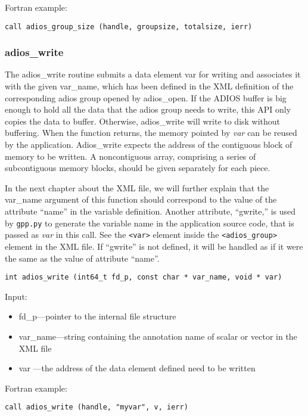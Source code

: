 Fortran example: 
\begin{lstlisting}[alsolanguage=Fortran, caption={}]
call adios_group_size (handle, groupsize, totalsize, ierr)
\end{lstlisting}

\subsubsection{adios\_write}
The adios\_write routine submits a data element var for writing and associates 
it with the given var\_name, which has been defined in the XML definition of the 
corresponding adios group opened by 
adios\_open. If the ADIOS buffer is big enough to hold all the data that the adios 
group needs to write, this API only copies the data to buffer. Otherwise, adios\_write 
will write to disk without buffering. When the function returns, the memory pointed
by \textit{var} can be reused by the application. 
Adios\_write expects the address of the contiguous block of memory to be written. 
A noncontiguous array, comprising a series of subcontiguous memory blocks, 
should be given separately for each piece.

In the next chapter about the XML file, we will further explain that the var\_name
argument of this function should correspond to the value of the
attribute ``name'' in the variable definition. 
Another attribute, ``gwrite,'' is used by \verb+gpp.py+ to generate the variable name in
the application source code, that is passed as \textit{var} in this call. 
See the \verb+<var>+ element inside the \verb+<adios_group>+ element 
in the XML file. 
If ``gwrite'' is not defined, it will be handled as if it were the same as the value of attribute ``name''.


\begin{lstlisting}[alsolanguage=C,caption={},label={}]
int adios_write (int64_t fd_p, const char * var_name, void * var)
\end{lstlisting}

Input:
\begin{itemize}
\item fd\_p---pointer to the internal file structure
\item var\_name---string containing the annotation name of scalar or vector in the XML file
\item var ---the address of the data element defined need to be written
\end{itemize}

Fortran example: 
\begin{lstlisting}[alsolanguage=Fortran,caption={},label={}]
call adios_write (handle, "myvar", v, ierr)
\end{lstlisting}

